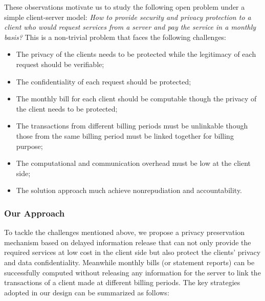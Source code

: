 \documentclass[letterpaper,12pt]{article}
\begin{document}
These observations motivate us to study the following open problem under a simple client-server model:  \emph{How to provide security and privacy protection to a client who would request services from a server and pay the service in a monthly basis?} This is a non-trivial problem that faces the following challenges:
\begin{itemize}
\item The privacy of the clients needs to be protected while the legitimacy of each request should be verifiable;

\item The confidentiality of each request should be protected;

\item The monthly bill for each client should be computable though the privacy of the client needs to be protected;

\item The transactions from different billing periods must be unlinkable though those from the same billing period must be linked together for billing purpose;

\item The computational and communication overhead must be low at the client side;

\item The solution approach much achieve nonrepudiation and accountability.

\end{itemize}

\subsubsection{Our Approach}

To tackle the challenges mentioned above, we propose a privacy preservation mechanism based on delayed information release that can not only provide the required services at low cost in the client side but also protect the clients' privacy and data confidentiality. Meanwhile monthly bills (or statement reports) can be successfully computed without releasing any information for the server to link the transactions of a client made at different billing periods. The key strategies adopted in our design can be summarized as follows:
\end{document}
